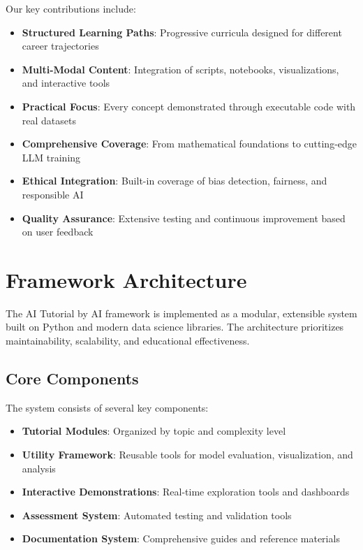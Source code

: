 \documentclass[11pt,twocolumn]{article}
\begin{document}
Our key contributions include:

\begin{itemize}
    \item \textbf{Structured Learning Paths}: Progressive curricula designed for different career trajectories
    \item \textbf{Multi-Modal Content}: Integration of scripts, notebooks, visualizations, and interactive tools
    \item \textbf{Practical Focus}: Every concept demonstrated through executable code with real datasets
    \item \textbf{Comprehensive Coverage}: From mathematical foundations to cutting-edge LLM training
    \item \textbf{Ethical Integration}: Built-in coverage of bias detection, fairness, and responsible AI
    \item \textbf{Quality Assurance}: Extensive testing and continuous improvement based on user feedback
\end{itemize}

\section{Framework Architecture}

The AI Tutorial by AI framework is implemented as a modular, extensible system built on Python and modern data science libraries. The architecture prioritizes maintainability, scalability, and educational effectiveness.

\subsection{Core Components}

The system consists of several key components:

\begin{itemize}
    \item \textbf{Tutorial Modules}: Organized by topic and complexity level
    \item \textbf{Utility Framework}: Reusable tools for model evaluation, visualization, and analysis
    \item \textbf{Interactive Demonstrations}: Real-time exploration tools and dashboards
    \item \textbf{Assessment System}: Automated testing and validation tools
    \item \textbf{Documentation System}: Comprehensive guides and reference materials
\end{itemize}
\end{document}
